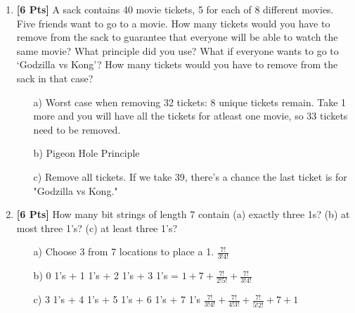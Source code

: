 \documentclass[11pt]{article}
\begin{document}
\begin{enumerate}
        \newpage
        \item {\bf [6 Pts]} A sack contains 40 movie tickets, 5 for each of 8 different movies. Five friends want to go to a movie. How many tickets would you have to remove from the sack to guarantee that everyone will be able to watch the same movie? What principle did you use? What if everyone wants to go to `Godzilla vs Kong'? How many tickets would you have to remove from the sack in that case?
        \begin{enumerate}
                \item[a)] Worst case when removing 32 tickets: 8 unique tickets remain. Take 1 more and you will have all the tickets for atleast one movie, so 33 tickets need to be removed.
                \item[b)] Pigeon Hole Principle
                \item[c)] Remove all tickets. If we take 39, there's a chance the last ticket is for "Godzilla vs Kong."
        \end{enumerate}

        \item {\bf [6 Pts]} How many bit strings of length 7 contain (a) exactly three 1s? (b)  at most three 1's? (c) at least three 1's?
        \begin{enumerate}
                \item[a)] Choose 3 from 7 locations to place a 1. $\frac{7!}{3!4!}$
                \item[b)] 0 1's + 1 1's + 2 1's + 3 1's = $1 + 7 + \frac{7!}{2!5!} + \frac{7!}{3!4!}$
                \item[c)] 3 1's + 4 1's + 5 1's + 6 1's + 7 1's $\frac{7!}{3!4!} + \frac{7!}{4!3!} + \frac{7!}{5!2!} + 7 + 1$
        \end{enumerate}


\end{enumerate}
\end{document}
